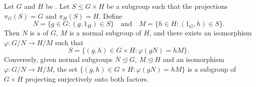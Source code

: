 \begin{lemma} \label{lemma:goursats_lemma_for_subgroups_of_product_group_surjecting_onto_both_factors}
Let $G$ and $H$ be . Let $S \leq G \times H$ be a subgroup such that the projections $\pi_G(S) = G$ and $\pi_H(S) = H$. Define
$$N = \{g \in G : (g, 1_H) \in S\} \quad \text{and} \quad M = \{h \in H : (1_G, h) \in S\}.$$
Then $N$ is a  of $G$, $M$ is a normal subgroup of $H$, and there exists an isomorphism $\varphi: G/N \to H/M$ such that
$$S = \{(g, h) \in G \times H : \varphi(gN) = hM\}.$$
Conversely, given normal subgroups $N \trianglelefteq G$, $M \trianglelefteq H$ and an isomorphism $\varphi: G/N \to H/M$, the set $\{(g, h) \in G \times H : \varphi(gN) = hM\}$ is a subgroup of $G \times H$ projecting surjectively onto both factors.
\end{lemma}
